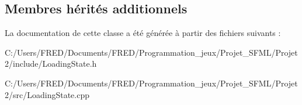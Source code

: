 \subsection*{Membres hérités additionnels}


La documentation de cette classe a été générée à partir des fichiers suivants \+:\begin{DoxyCompactItemize}
\item 
C\+:/\+Users/\+F\+R\+E\+D/\+Documents/\+F\+R\+E\+D/\+Programmation\+\_\+jeux/\+Projet\+\_\+\+S\+F\+M\+L/\+Projet2/include/Loading\+State.\+h\item 
C\+:/\+Users/\+F\+R\+E\+D/\+Documents/\+F\+R\+E\+D/\+Programmation\+\_\+jeux/\+Projet\+\_\+\+S\+F\+M\+L/\+Projet2/src/Loading\+State.\+cpp\end{DoxyCompactItemize}
